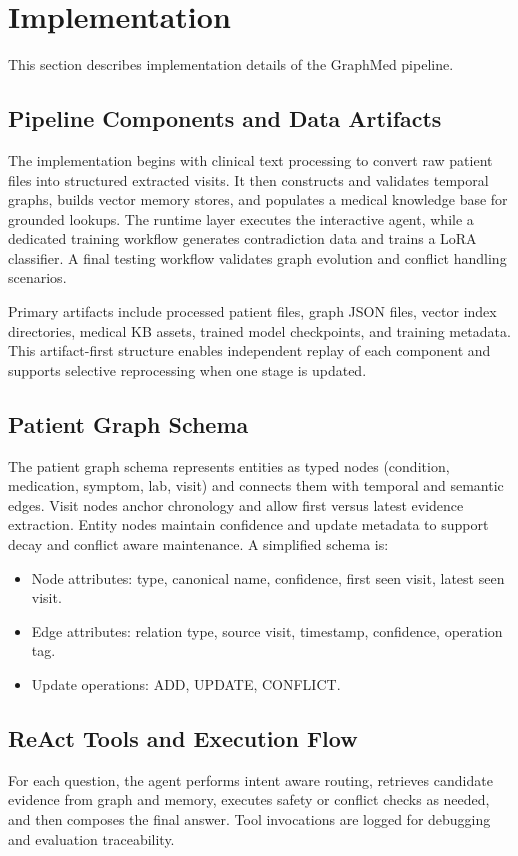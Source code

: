 \documentclass[conference]{IEEEtran}
\begin{document}
\section{Implementation}
This section describes implementation details of the GraphMed pipeline.

\subsection{Pipeline Components and Data Artifacts}
The implementation begins with clinical text processing to convert raw patient files into structured extracted visits. It then constructs and validates temporal graphs, builds vector memory stores, and populates a medical knowledge base for grounded lookups. The runtime layer executes the interactive agent, while a dedicated training workflow generates contradiction data and trains a LoRA classifier. A final testing workflow validates graph evolution and conflict handling scenarios.

Primary artifacts include processed patient files, graph JSON files, vector index directories, medical KB assets, trained model checkpoints, and training metadata. This artifact-first structure enables independent replay of each component and supports selective reprocessing when one stage is updated.

\subsection{Patient Graph Schema}
The patient graph schema represents entities as typed nodes (condition, medication, symptom, lab, visit) and connects them with temporal and semantic edges. Visit nodes anchor chronology and allow first versus latest evidence extraction. Entity nodes maintain confidence and update metadata to support decay and conflict aware maintenance. A simplified schema is:
\begin{itemize}
    \item Node attributes: type, canonical name, confidence, first seen visit, latest seen visit.
    \item Edge attributes: relation type, source visit, timestamp, confidence, operation tag.
    \item Update operations: ADD, UPDATE, CONFLICT.
\end{itemize}

\subsection{ReAct Tools and Execution Flow}
For each question, the agent performs intent aware routing, retrieves candidate evidence from graph and memory, executes safety or conflict checks as needed, and then composes the final answer. Tool invocations are logged for debugging and evaluation traceability.
\end{document}
